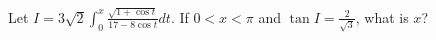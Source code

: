 Let $\displaystyle I = 3 \sqrt{2} \int_0^x \frac{\sqrt{1+\cos t}}{17 - 8\cos t}
dt$. If $0 < x < \pi$ and $\tan I = \frac{2}{\sqrt{3}}$, what is $x$?

